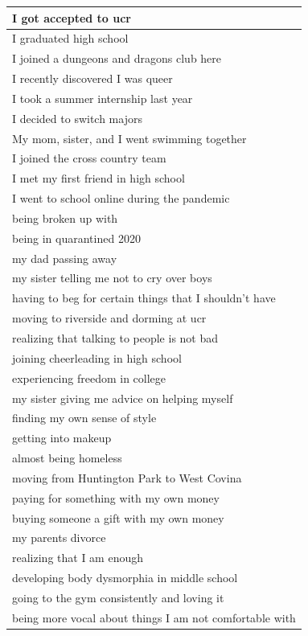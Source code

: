 \documentclass[
  .7em,
  letterpaper,
  DIV=11,
  numbers=noendperiod]{scrartcl}
\begin{document}
\begin{table}
\begin{tabular}{l}
\hline
I got accepted to ucr\\
\hline
I graduated high school\\
\hline
I joined a dungeons and dragons club here\\
\hline
I recently discovered I was queer\\
\hline
I took a summer internship last year\\
\hline
I decided to switch majors\\
\hline
My mom, sister, and I went swimming together\\
\hline
I joined the cross country team\\
\hline
I met my first friend in high school\\
\hline
I went to school online during the pandemic\\
\hline
being broken up with\\
\hline
being in quarantined 2020\\
\hline
my dad passing away\\
\hline
my sister telling me not to cry over boys\\
\hline
having to beg for certain things that I shouldn't have\\
\hline
moving to riverside and dorming at ucr\\
\hline
realizing that talking to people is not bad\\
\hline
joining cheerleading in high school\\
\hline
experiencing freedom in college\\
\hline
my sister giving me advice on helping myself\\
\hline
finding my own sense of style\\
\hline
getting into makeup\\
\hline
almost being homeless\\
\hline
moving from Huntington Park to West Covina\\
\hline
paying for something with my own money\\
\hline
buying someone a gift with my own money\\
\hline
my parents divorce\\
\hline
realizing that I am enough\\
\hline
developing body dysmorphia in middle school\\
\hline
going to the gym consistently and loving it\\
\hline
being more vocal about things I am not comfortable with\\

\end{tabular}
\end{table}
\end{document}
